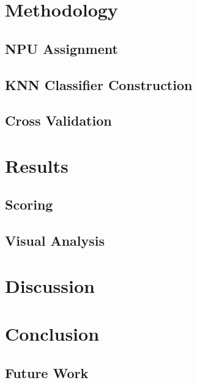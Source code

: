 \documentclass[11pt]{amsart}
\begin{document}
\section{Methodology}
\subsection{NPU Assignment}
\subsection{KNN Classifier Construction}
\subsection{Cross Validation}
\section{Results}
\subsection{Scoring}
\subsection{Visual Analysis}
\section{Discussion}
\section{Conclusion}
\subsection{Future Work}


\end{document}
